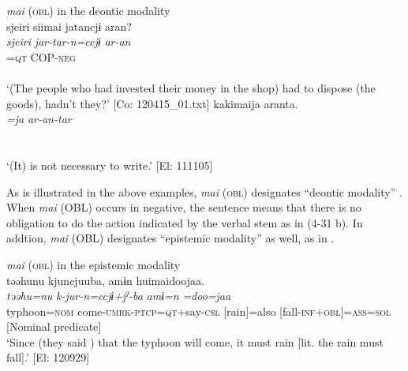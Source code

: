\ea  \textit{mai} (\textsc{obl}) in the deontic modality \label{ex:4.31}
  \ea{}\\
\gllll {\textbar}sjeiri{\textbar}  siimai  jatancjɨ  aran?\\
      \textit{sjeiri}  \textit{}  \textit{jar-tar-n=ccjɨ}  \textit{ar-an}\\
      [disposal  do-\textsc{inf}+\textsc{obl}  \textsc{cop}-\textsc{pst}-\textsc{ptcp}]=\textsc{qt}  COP-\textsc{neg}\\
      [Nominal predicate]  \\
      \glt       ‘(The people who had invested their money in the shop) had to dispose (the goods), hadn’t they?’ [Co: 120415\_01.txt]
\ex \label{ex:4.31b}%
\gllll kakimaija  aranta.\\
      \textit{=ja}  \textit{ar-an-tar}\\
      [write-\textsc{inf}+\textsc{obl}=\textsc{top}  \textsc{cop}-\textsc{neg}-\textsc{pst}]\\
      [Nominal predicate]\\
      \glt       ‘(It) is not necessary to write.’ [El: 111105]
    \z
\z

As is illustrated in the above examples, \textit{mai} (\textsc{obl}) designates “deontic modality” \citep[823]{Lyons1977}. When \textit{mai} (OBL) occurs in negative, the sentence means that there is no obligation to do the action indicated by the verbal stem as in (4-31 b). In addtion, \textit{mai} (OBL) designates “epistemic modality” \citep[793-809]{Lyons1977} as well, as in .

\ea  \textit{mai} (\textsc{obl}) in the epistemic modality \label{ex:4.32}\\
  \gllll təəhunu  kjuncjuuba,  amɨn   huimaidoojaa.\\
    \textit{təəhu=nu}  \textit{k-jur-n=ccjɨ+jˀ-ba}  \textit{amɨ=n} \textit{=doo=jaa}\\                                                                   
    typhoon=\textsc{nom}  come-\textsc{umrk}-\textsc{ptcp}=\textsc{qt}+say-\textsc{csl}  [rain]=also  [fall-\textsc{inf}+\textsc{obl}]=\textsc{ass}=\textsc{sol}\\
        [Subject]                                         [Nominal predicate]\\
  \glt ‘Since (they said ) that the typhoon will come, it must rain [lit. the rain must fall].’  [El: 120929]
\z

